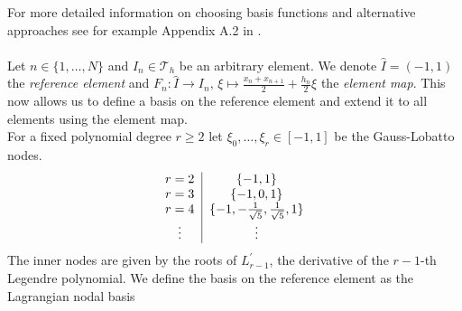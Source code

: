 For more detailed information on choosing basis functions and alternative approaches see for example
Appendix A.2 in \cite{diPietro2012}. \\ \\
Let $n\in \{1,\ldots,N\}$ and $I_n \in \mathcal{T}_h$ be an arbitrary element.
We denote $\hat{I} = (-1,1)$ the \textit{reference element} and $\displaystyle F_n : \hat{I} \to I_n, \, \xi \mapsto \frac{x_n + x_{n+1}}{2} + \frac{h_n}{2} \xi $
the \textit{element map}. This now allows us to define a basis on the reference element and
extend it to all elements using the element map. \\
For a fixed polynomial degree $r \geq 2$ let $\xi_0,\ldots,\xi_{r} \in [-1,1]$ be the
Gauss-Lobatto nodes. \\
\begin{equation*}
	\begin{tabular}{c|c}
		\centering
		$r = 2$ & $\{-1, 1\}$                                         \\
		$r = 3$ & $\{-1,0, 1\}$                                       \\
		$r = 4$ & $\{-1,-\frac{1}{\sqrt{5}}, \frac{1}{\sqrt{5}}, 1\}$ \\
		\vdots  & \vdots                                              \\
	\end{tabular}
\end{equation*}
The inner nodes are given by the roots of $L_{r-1}^{\prime}$, the derivative of the $r-1$-th Legendre polynomial.
We define the basis on the reference element as the Lagrangian nodal basis

